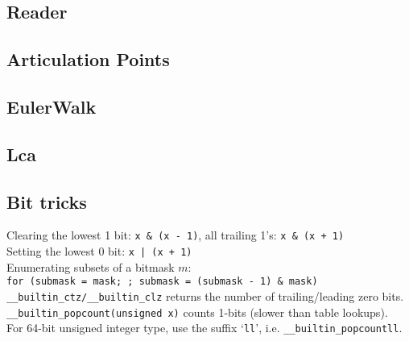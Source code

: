 \documentclass[12pt]{extarticle}
\begin{document}
\begin{multicols*}{2}
\subsection{Reader}


% 

%

\subsection{Articulation Points}


% 


\subsection{EulerWalk}



\subsection{Lca}



% 



\subsection{Bit tricks}
Clearing the lowest 1 bit: \verb$x & (x - 1)$, all trailing 1's: \verb$x & (x + 1)$ \\
Setting the lowest 0 bit: \verb$x | (x + 1)$ \\
Enumerating subsets of a bitmask $m$: \\
\verb|for (submask = mask; ; submask = (submask - 1) & mask)| \\
\verb$__builtin_ctz/__builtin_clz$ returns the number of trailing/leading zero bits. \\
\verb$__builtin_popcount(unsigned x)$ counts 1-bits (slower than table lookups). \\
For 64-bit unsigned integer type, use the suffix `\verb$ll$', i.e. \verb$__builtin_popcountll$.


\end{multicols*}
\end{document}

